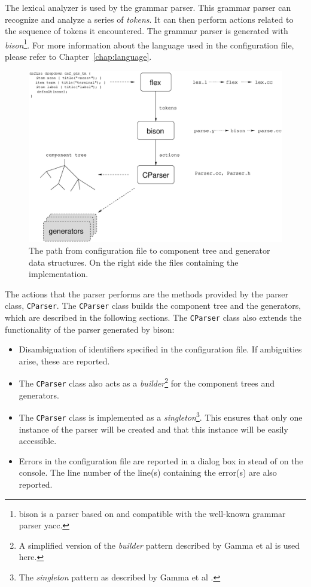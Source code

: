 The lexical analyzer is used by the grammar parser. This grammar parser can
recognize and analyze a series of \emph{tokens}. It can then perform actions
related to the sequence of tokens it encountered. The grammar parser is
generated with \emph{bison}\footnote{bison is a parser based on and compatible
with the well-known grammar parser yacc.}. For more information about the
language used in the configuration file, please refer to \mbox{Chapter
\ref{chap:language}}.

\begin{figure} \begin{center}
\includegraphics[width=12cm]{./figures/parser.eps}
\caption{The path from configuration file to component tree and generator data
structures. On the right side the files containing the implementation.}
\label{fig:design:parser}
\end{center} \end{figure}

The actions that the parser performs are the methods provided by the parser
class, \verb=CParser=. The \verb=CParser= class builds the component tree and
the generators, which are described in the following sections. The
\verb=CParser= class also extends the functionality of the parser generated by
bison:
\begin{itemize}
\item Disambiguation of identifiers specified in the configuration file. If
ambiguities arise, these are reported. \item The \verb=CParser= class also acts
as a \emph{builder}\footnote{A simplified version of the \emph{builder} pattern
described by Gamma et al \cite{Gamma} is used here.} for the component trees
and generators.
\item The \verb=CParser= class is implemented as a \emph{singleton}\footnote{The
\emph{singleton} pattern as described by Gamma et al \cite{Gamma}.}. This
ensures that only one instance of the parser will be created and that this
instance will be easily accessible.
\item Errors in the configuration file are reported in a dialog box in
stead of on the console. The line number of the line(s) containing the error(s)
are also reported.
\end{itemize}

